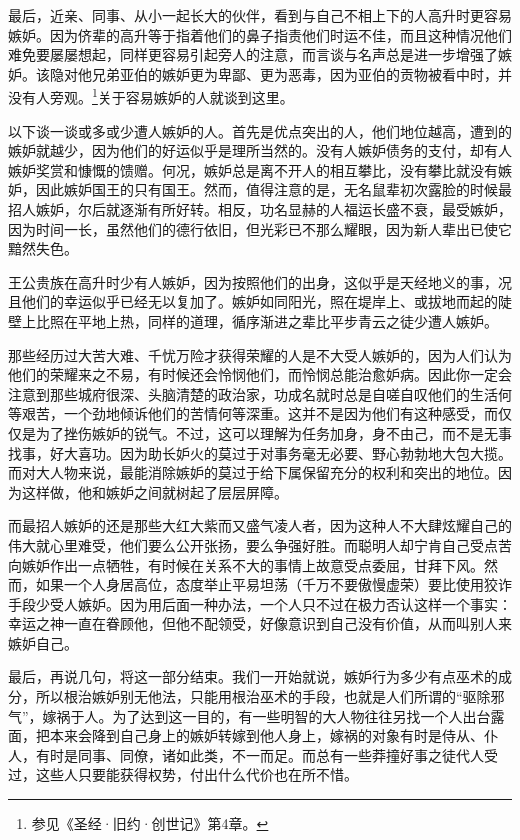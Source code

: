\par 最后，近亲、同事、从小一起长大的伙伴，看到与自己不相上下的人高升时更容易嫉妒。因为侪辈的高升等于指着他们的鼻子指责他们时运不佳，而且这种情况他们难免要屡屡想起，同样更容易引起旁人的注意，而言谈与名声总是进一步增强了嫉妒。该隐对他兄弟亚伯的嫉妒更为卑鄙、更为恶毒，因为亚伯的贡物被看中时，并没有人旁观。\footnote{参见《圣经·旧约·创世记》第4章。}关于容易嫉妒的人就谈到这里。
\par 以下谈一谈或多或少遭人嫉妒的人。首先是优点突出的人，他们地位越高，遭到的嫉妒就越少，因为他们的好运似乎是理所当然的。没有人嫉妒债务的支付，却有人嫉妒奖赏和慷慨的馈赠。何况，嫉妒总是离不开人的相互攀比，没有攀比就没有嫉妒，因此嫉妒国王的只有国王。然而，值得注意的是，无名鼠辈初次露脸的时候最招人嫉妒，尔后就逐渐有所好转。相反，功名显赫的人福运长盛不衰，最受嫉妒，因为时间一长，虽然他们的德行依旧，但光彩已不那么耀眼，因为新人辈出已使它黯然失色。
\par 王公贵族在高升时少有人嫉妒，因为按照他们的出身，这似乎是天经地义的事，况且他们的幸运似乎已经无以复加了。嫉妒如同阳光，照在堤岸上、或拔地而起的陡壁上比照在平地上热，同样的道理，循序渐进之辈比平步青云之徒少遭人嫉妒。
\par 那些经历过大苦大难、千忧万险才获得荣耀的人是不大受人嫉妒的，因为人们认为他们的荣耀来之不易，有时候还会怜悯他们，而怜悯总能治愈妒病。因此你一定会注意到那些城府很深、头脑清楚的政治家，功成名就时总是自嗟自叹他们的生活何等艰苦，一个劲地倾诉他们的苦情何等深重。这并不是因为他们有这种感受，而仅仅是为了挫伤嫉妒的锐气。不过，这可以理解为任务加身，身不由己，而不是无事找事，好大喜功。因为助长妒火的莫过于对事务毫无必要、野心勃勃地大包大揽。而对大人物来说，最能消除嫉妒的莫过于给下属保留充分的权利和突出的地位。因为这样做，他和嫉妒之间就树起了层层屏障。
\par 而最招人嫉妒的还是那些大红大紫而又盛气凌人者，因为这种人不大肆炫耀自己的伟大就心里难受，他们要么公开张扬，要么争强好胜。而聪明人却宁肯自己受点苦向嫉妒作出一点牺牲，有时候在关系不大的事情上故意受点委屈，甘拜下风。然而，如果一个人身居高位，态度举止平易坦荡（千万不要傲慢虚荣）要比使用狡诈手段少受人嫉妒。因为用后面一种办法，一个人只不过在极力否认这样一个事实：幸运之神一直在眷顾他，但他不配领受，好像意识到自己没有价值，从而叫别人来嫉妒自己。
\par 最后，再说几句，将这一部分结束。我们一开始就说，嫉妒行为多少有点巫术的成分，所以根治嫉妒别无他法，只能用根治巫术的手段，也就是人们所谓的“驱除邪气”，嫁祸于人。为了达到这一目的，有一些明智的大人物往往另找一个人出台露面，把本来会降到自己身上的嫉妒转嫁到他人身上，嫁祸的对象有时是侍从、仆人，有时是同事、同僚，诸如此类，不一而足。而总有一些莽撞好事之徒代人受过，这些人只要能获得权势，付出什么代价也在所不惜。
